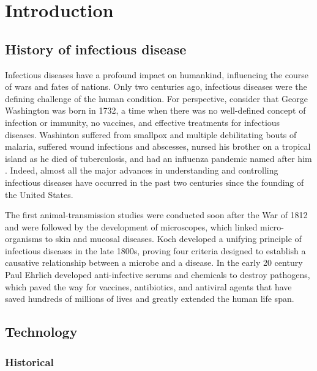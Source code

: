 
\chapter{Introduction}

\section{History of infectious disease}

Infectious diseases have a profound impact on humankind, influencing the course of wars and fates of nations. Only two centuries ago, infectious diseases were the defining challenge of the human condition. For perspective, consider that George Washington was born in 1732, a time when there was no well-defined concept of infection or immunity, no vaccines, and effective treatments for infectious diseases. Washinton suffered from smallpox and multiple debilitating bouts of malaria, suffered wound infections and abscesses, nursed his brother on a tropical island as he died of tuberculosis, and had an influenza pandemic named after him \cite{Fauci:2012us}. Indeed, almost all the major advances in understanding and controlling infectious diseases have occurred in the past two centuries since the founding of the United States. 

The first animal-transmission studies were conducted soon after the War of 1812 and were followed by the development of microscopes, which linked micro-organisms to skin and mucosal diseases. Koch developed a unifying principle of infectious diseases in the late 1800s, proving  four criteria designed to establish a causative relationship between a microbe and a disease. In the early 20 century Paul Ehrlich developed anti-infective serums and chemicals to destroy pathogens, which paved the way for vaccines, antibiotics, and antiviral agents that have saved hundreds of millions of lives and greatly extended the human life span.

\section{Technology}

\subsection{Historical}

